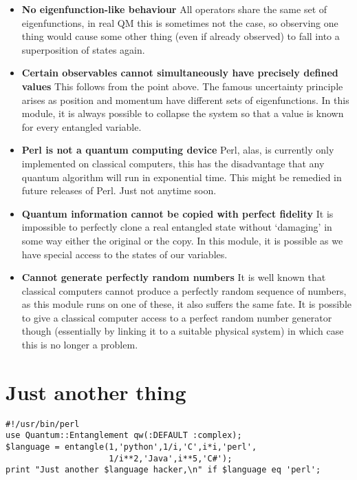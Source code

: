 \documentclass{article}      %
\begin{document}
\begin{itemize}
\item \textbf{No eigenfunction-like behaviour} All operators share the same set
of eigenfunctions, in real QM this is sometimes not the case, so
observing one thing would cause some other thing (even if already
observed) to fall into a superposition of states again.

\item \textbf{Certain observables cannot simultaneously have precisely
defined values} This follows from the point above.  The famous uncertainty
principle arises as position and momentum have different
sets of eigenfunctions.  In this module, it is always possible to collapse
the system so that a value is known for every entangled variable.

\item \textbf{Perl is not a quantum computing device}
Perl, alas, is currently only implemented on classical computers, this
has the disadvantage that any quantum algorithm will run in
exponential time.  This might be remedied in future releases of Perl.
Just not anytime soon.

\item \textbf{Quantum information cannot be copied with perfect fidelity}
It is impossible to perfectly clone a real entangled state without
`damaging' in some way either the original or the copy.  In this
module, it is possible as we have special access to the states of our
variables.

\item \textbf{Cannot generate perfectly random numbers}
It is well known that classical computers cannot produce a perfectly
random sequence of numbers, as this module runs on one of these, it
also suffers the same fate.  It is possible to give a classical computer
access to a perfect random number generator though (essentially by
linking it to a suitable physical system) in which case this is no
longer a problem.

\end{itemize}

\section{Just another thing}
\begin{verbatim}
#!/usr/bin/perl
use Quantum::Entanglement qw(:DEFAULT :complex);
$language = entangle(1,'python',1/i,'C',i*i,'perl',
                     1/i**2,'Java',i**5,'C#');
print "Just another $language hacker,\n" if $language eq 'perl';
\end{verbatim} %
\end{document}
